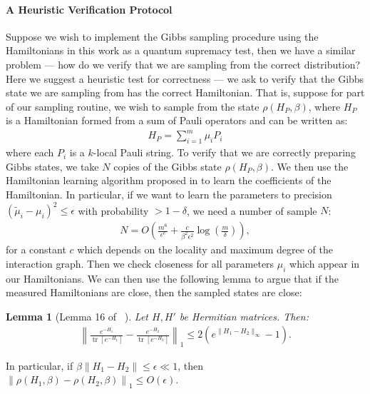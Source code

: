 \documentclass[a4paper,onecolumn,11pt,accepted=2017-05-09]{quantumarticle}
\newcommand{\norm}[1]{\left\lVert#1\right\rVert}
\DeclareMathOperator{\tr}{tr}
\newtheorem{lemma}[theorem]{Lemma}
\begin{document}
\paragraph{A Heuristic Verification Protocol} 
Suppose we wish to implement the Gibbs sampling procedure using the Hamiltonians in this work as a quantum supremacy test, then we have a similar problem --- how do we verify that we are sampling from the correct distribution?
 Here we suggest a heuristic test for correctness --- we ask to verify that the Gibbs state we are sampling from has the correct Hamiltonian.
 That is, suppose for part of our sampling routine, we wish to sample from the state $\rho(H_P,\beta)$, where $H_P$ is a Hamiltonian formed from a sum of Pauli operators and can be written as:
 \begin{align*}
     H_P = \sum_{i=1}^m \mu_i P_i
 \end{align*}
 where each $P_i$ is a $k$-local Pauli string. 
 To verify that we are correctly preparing Gibbs states, we take $N$ copies of the Gibbs state $\rho(H_P,\beta)$.
 We then use the Hamiltonian learning algorithm proposed in \cite[Theorem 6.1]{bakshi2023learning} to learn the coefficients of the Hamiltonian.
 In particular, if we want to learn the parameters to precision $(\tilde{\mu}_i-\mu_i)^2\leq \epsilon$ with probability $>1-\delta$, we need a number of sample $N$:
 \begin{align*}
    N= O\left( \frac{m^6}{\epsilon^{c}}+ \frac{c}{\beta^2\epsilon^2}\log\left(\frac{m}{\delta}\right)\right),
 \end{align*}
 for a constant $c$ which depends on the locality and maximum degree of the interaction graph.
 Then we check closeness for all parameters $\mu_i$ which appear in our Hamiltonians.
 We can then use the following lemma to argue that if the measured Hamiltonians are close, then the sampled states are close:
 \begin{lemma}[Lemma 16 of ~\cite{brandao2017quantum}]\label{lem:Gibbs_perturbation}
		Let $H,H'$ be Hermitian matrices. Then:
		\begin{align}
			\norm{\frac{e^{-H_1}}{\tr\left[e^{-H_1}\right]}-\frac{e^{-H_2}}{\tr\left[e^{-H_2}\right]}}_1 \leq 2(e^{\|H_1-H_2\|_\infty}-1).
		\end{align}
	\end{lemma}
 \noindent In particular, if $\beta\|H_1-H_2\|\leq \epsilon \ll 1$, then $\norm{\rho(H_1,\beta)- \rho(H_2,\beta)}_1\leq O(\epsilon)$. 
\end{document}
